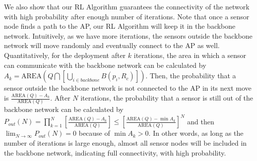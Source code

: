 \documentclass[journal,draftcls,onecolumn,12pt,twoside, narroweqnarray]{IEEEtran}
\begin{document}
We also show that our RL Algorithm guarantees the connectivity of the network with high probability after enough number of iterations.
Note that once a sensor node finds a path to the AP, our RL Algorithm will keep it in the backbone network.
Intuitively, as we have more iterations, the sensors outside the backbone network will move randomly and eventually connect to the AP as well.
Quantitatively, for the deployment after $k$ iterations, the area in which a sensor can communicate with the backbone network can be calculated by  $A_k=\mbox{AREA}\left(Q\bigcap\left[\bigcup_{i\in backbone}B(p_i,R_c)\right]\right)$. Then, the probability that a sensor outside the backbone network is not connected to the AP in its next move is $\frac{\mbox{AREA}(Q)-A_k}{\mbox{AREA}(Q)}$.
After $N$ iterations, the probability that a sensor is still out of the backbone network can be calculated by $P_{out}(N)=\prod_{k=1}^{N}\left[\frac{\mbox{AREA}(Q)-A_k}{\mbox{AREA}(Q)}\right]\leq\left[\frac{\mbox{AREA}(Q)-\min{A_k}}{\mbox{AREA}(Q)}\right]^N$ and then $\lim_{N\to\infty}P_{out}(N)=0$ because of $\min{A_k}>0$. In other words, as long as the number of iterations is large enough, almost all sensor nodes will be included in the backbone network, indicating full connectivity, with high probability.
\end{document}
